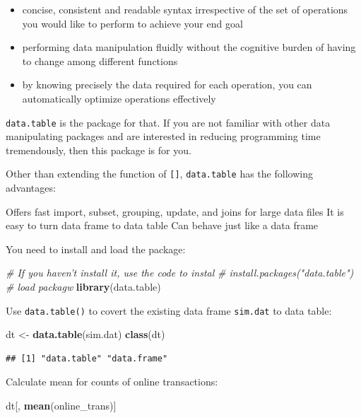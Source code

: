 \documentclass[12pt,]{krantz}
\newenvironment{Shaded}{\begin{snugshade}}{\end{snugshade}}
\newcommand{\KeywordTok}[1]{\textcolor[rgb]{0.13,0.29,0.53}{\textbf{{#1}}}}
\newcommand{\StringTok}[1]{\textcolor[rgb]{0.31,0.60,0.02}{{#1}}}
\newcommand{\CommentTok}[1]{\textcolor[rgb]{0.56,0.35,0.01}{\textit{{#1}}}}
\newcommand{\NormalTok}[1]{{#1}}
\providecommand{\tightlist}{%
  \setlength{\itemsep}{0pt}\setlength{\parskip}{0pt}}
\theoremstyle{definition}
\theoremstyle{definition}
\theoremstyle{remark}
\begin{document}
\begin{itemize}
\tightlist
\item
  concise, consistent and readable syntax irrespective of the set of
  operations you would like to perform to achieve your end goal
\item
  performing data manipulation fluidly without the cognitive burden of
  having to change among different functions
\item
  by knowing precisely the data required for each operation, you can
  automatically optimize operations effectively
\end{itemize}

\texttt{data.table} is the package for that. If you are not familiar
with other data manipulating packages and are interested in reducing
programming time tremendously, then this package is for you.

Other than extending the function of \texttt{{[}{]}},
\texttt{data.table} has the following advantages:

Offers fast import, subset, grouping, update, and joins for large data
files It is easy to turn data frame to data table Can behave just like a
data frame

You need to install and load the package:

\begin{Shaded}
\begin{Highlighting}[]
\CommentTok{# If you haven't install it, use the code to instal}
\CommentTok{# install.packages("data.table")}
\CommentTok{# load packagw}
\KeywordTok{library}\NormalTok{(data.table)}
\end{Highlighting}
\end{Shaded}

Use \texttt{data.table()} to covert the existing data frame
\texttt{sim.dat} to data table:

\begin{Shaded}
\begin{Highlighting}[]
\NormalTok{dt <-}\StringTok{ }\KeywordTok{data.table}\NormalTok{(sim.dat)}
\KeywordTok{class}\NormalTok{(dt)}
\end{Highlighting}
\end{Shaded}

\begin{verbatim}
## [1] "data.table" "data.frame"
\end{verbatim}

Calculate mean for counts of online transactions:

\begin{Shaded}
\begin{Highlighting}[]
\NormalTok{dt[, }\KeywordTok{mean}\NormalTok{(online_trans)]}
\end{Highlighting}
\end{Shaded}
\end{document}
